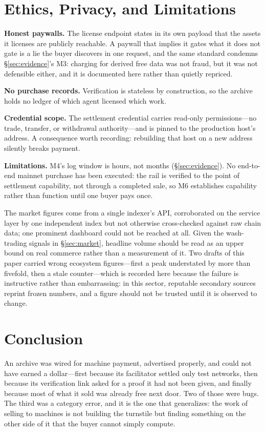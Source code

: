 \documentclass[10pt,letterpaper,twocolumn]{article}
\begin{document}
\section{Ethics, Privacy, and Limitations}

\textbf{Honest paywalls.} The license endpoint states in its own payload that
the assets it licenses are publicly reachable. A paywall that implies it gates
what it does not gate is a lie the buyer discovers in one request, and the
same standard condemns \S\ref{sec:evidence}'s M3: charging for derived free
data was not fraud, but it was not defensible either, and it is documented
here rather than quietly repriced.

\textbf{No purchase records.} Verification is stateless by construction, so
the archive holds no ledger of which agent licensed which work.

\textbf{Credential scope.} The settlement credential carries read-only
permissions---no trade, transfer, or withdrawal authority---and is pinned to
the production host's address. A consequence worth recording: rebuilding that
host on a new address silently breaks payment.

\textbf{Limitations.} M4's log window is hours, not months
(\S\ref{sec:evidence}). No end-to-end mainnet purchase has been executed: the
rail is verified to the point of settlement capability, not through a completed
sale, so M6 establishes capability rather than function until one buyer pays
once.

The market figures come from a single indexer's API, corroborated on the
service layer by one independent index but not otherwise cross-checked against
raw chain data; one prominent dashboard could not be reached at all. Given the
wash-trading signals in \S\ref{sec:market}, headline volume should be read as
an upper bound on real commerce rather than a measurement of it. Two drafts of
this paper carried wrong ecosystem figures---first a peak understated by more
than fivefold, then a stale counter---which is recorded here because the
failure is instructive rather than embarrassing: in this sector, reputable
secondary sources reprint frozen numbers, and a figure should not be trusted
until it is observed to change.

\section{Conclusion}

An archive was wired for machine payment, advertised properly, and could not
have earned a dollar---first because its facilitator settled only test
networks, then because its verification link asked for a proof it had not
been given, and finally because most of what it sold was already free next
door. Two of those were bugs. The third was a category error, and it is the
one that generalizes: the work of selling to machines is not building the
turnstile but finding something on the other side of it that the buyer cannot
simply compute.
\end{document}
